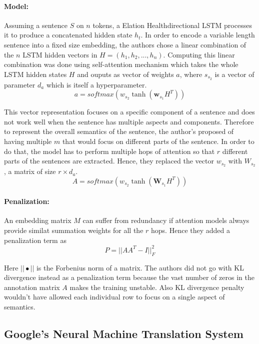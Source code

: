 \documentclass{article}
\begin{document}
	\paragraph{Model: } Assuming a sentence \(S\) on \(n\) tokens, a Elation Healthdirectional LSTM processes it to produce a concatenated hidden state \(h_t\). In order to encode a variable length sentence into a fixed size embedding, the authors chose a linear combination of the \(n\) LSTM hidden vectors in \(H = (h_1, h_2, ..., h_n)\). Computing this linear combination was done using self-attention mechanism which takes the whole LSTM hidden states \(H\) and ouputs as vector of weights \(a\), where \(s_{s_2}\) is a vector of parameter \(d_a\) which is itself a hyperparameter. 
	\[a = softmax(w_{s_2} \tanh (\textbf{w}_{s_1} H^T))\]
	
	This vector representation focuses on a specific component of a sentence and does not work well when the sentence has multiple aspects and components. Therefore to represent the overall semantics of the sentence, the author's proposed of having multiple \(m\) that would focus on different parts of the sentence. In order to do that, the model has to perform multiple hops of attention so that \(r\) different parts of the sentences are extracted. Hence, they replaced the vector \(w_{s_2}\) with \(W_{s_2}\), a matrix of size \(r \times d_a\).
	\[A = softmax(w_{s_2} \tanh (\textbf{W}_{s_1} H^T))\]
	
	\paragraph{Penalization: } An embedding matrix \(M\) can suffer from redundancy if attention models always provide similat summation weights for all the \(r\) hops. Hence they added a penalization term as 
	\[P = ||AA^T-I||_F^2\]
	
	Here \(||\bullet||\) is the Forbenius norm of a matrix. The authors did not go with KL divergence instead as a penalization term because the vast number of zeros in the annotation matrix \(A\) makes the training unstable. Also KL divergence penalty wouldn't have allowed each individual row to focus on a single aspect of semantics. 
	
\subsection{Google's Neural Machine Translation System}
\label{sec:goognmt}
\end{document}
